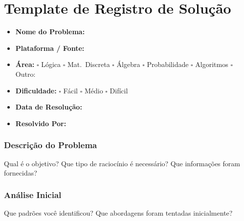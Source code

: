 \clearpage

\section{Template de Registro de Solução}

\begin{infobox}[title=\textbf{Informações Básicas}]
  \begin{itemize}[leftmargin=1.2em]
    \item \textbf{Nome do Problema:} \hrulefill
    \item \textbf{Plataforma / Fonte:} \hrulefill
    \item \textbf{Área:} \hspace{0.3em}
      $\square$ Lógica \hspace{0.3em}
      $\square$ Mat.\ Discreta \hspace{0.3em}
      $\square$ Álgebra \hspace{0.3em}
      $\square$ Probabilidade \hspace{0.3em}
      $\square$ Algoritmos \hspace{0.3em}
      $\square$ Outro: \underline{\hspace{1.5cm}}
    \item \textbf{Dificuldade:} \hspace{0.3em}
      $\square$ Fácil \hspace{0.3em}
      $\square$ Médio \hspace{0.3em}
      $\square$ Difícil
    \item \textbf{Data de Resolução:} \hrulefill
    \item \textbf{Resolvido Por:} \hrulefill
  \end{itemize}
\end{infobox}

\vspace{0.8em}
\subsubsection*{Descrição do Problema}
Qual é o objetivo? Que tipo de raciocínio é necessário? Que informações foram fornecidas?
\vspace{3.5em}

\subsubsection*{Análise Inicial}
Que padrões você identificou? Que abordagens foram tentadas inicialmente?
\vspace{3.5em}

